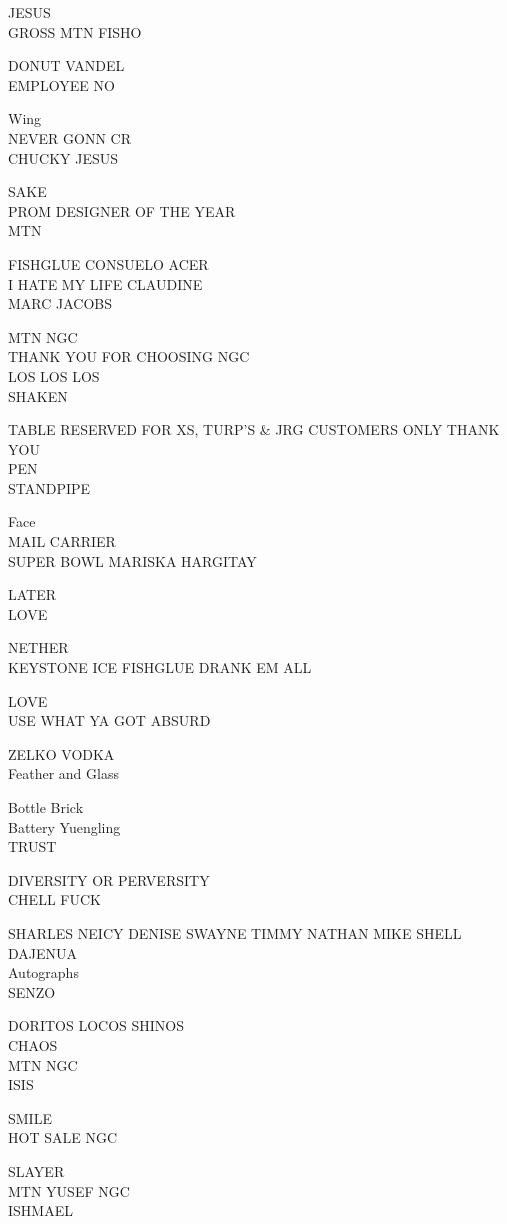 \documentclass[10pt,letterpaper]{article}
\begin{document}
JESUS\\
GROSS MTN FISHO

DONUT VANDEL\\
EMPLOYEE NO

Wing\\
NEVER GONN CR\\
CHUCKY JESUS

SAKE\\
PROM DESIGNER OF THE YEAR\\
MTN

FISHGLUE CONSUELO ACER\\
I HATE MY LIFE CLAUDINE\\
MARC JACOBS

MTN NGC\\
THANK YOU FOR CHOOSING NGC\\
LOS LOS LOS\\
SHAKEN

TABLE RESERVED FOR XS, TURP'S \& JRG CUSTOMERS ONLY THANK YOU\\
PEN\\
STANDPIPE

Face\\
MAIL CARRIER\\
SUPER BOWL MARISKA HARGITAY

LATER\\
LOVE

NETHER\\
KEYSTONE ICE FISHGLUE DRANK EM ALL

LOVE\\
USE WHAT YA GOT ABSURD

ZELKO VODKA\\
Feather and Glass

Bottle Brick\\
Battery Yuengling\\
TRUST

DIVERSITY OR PERVERSITY\\
CHELL FUCK

SHARLES NEICY DENISE SWAYNE TIMMY NATHAN MIKE SHELL DAJENUA\\
Autographs\\
SENZO

DORITOS LOCOS SHINOS\\
CHAOS\\
MTN NGC\\
ISIS

SMILE\\
HOT SALE NGC

SLAYER\\
MTN YUSEF NGC\\
ISHMAEL
\end{document}
